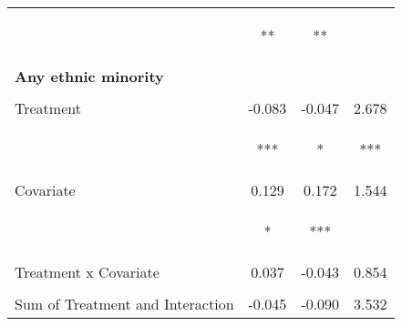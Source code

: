 \begin{tabular}{lccc}
 & \begin{footnotesize}[0.040]**\end{footnotesize} & \begin{footnotesize}[0.035]**\end{footnotesize} & \begin{footnotesize}[1.288]\end{footnotesize}\\
\noalign{\smallskip}\textbf{Any ethnic minority} &  &  & \\
 & \begin{footnotesize}\end{footnotesize} & \begin{footnotesize}\end{footnotesize} & \begin{footnotesize}\end{footnotesize}\\
\noalign{\smallskip}Treatment & -0.083 & -0.047 & 2.678\\
 & \begin{footnotesize}[0.032]***\end{footnotesize} & \begin{footnotesize}[0.028]*\end{footnotesize} & \begin{footnotesize}[1.010]***\end{footnotesize}\\
\noalign{\smallskip}Covariate & 0.129 & 0.172 & 1.544\\
 & \begin{footnotesize}[0.073]*\end{footnotesize} & \begin{footnotesize}[0.062]***\end{footnotesize} & \begin{footnotesize}[2.754]\end{footnotesize}\\
\noalign{\smallskip}Treatment x Covariate & 0.037 & -0.043 & 0.854\\
 & \begin{footnotesize}[0.080]\end{footnotesize} & \begin{footnotesize}[0.071]\end{footnotesize} & \begin{footnotesize}[2.853]\end{footnotesize}\\
\noalign{\smallskip}Sum of Treatment and Interaction & -0.045 & -0.090 & 3.532\\

\end{tabular}

